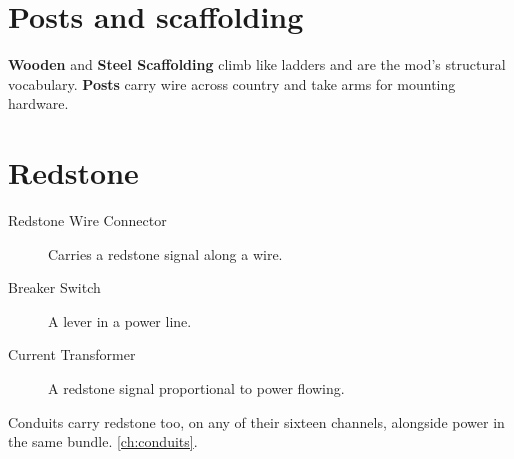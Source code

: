 \section{Posts and scaffolding}

\textbf{Wooden} and \textbf{Steel Scaffolding} climb like ladders and are the mod's structural
vocabulary. \textbf{Posts} carry wire across country and take arms for mounting hardware.

\section{Redstone}

\begin{description}
\item[Redstone Wire Connector] Carries a redstone signal along a wire.
\item[Breaker Switch] A lever in a power line.
\item[Current Transformer] A redstone signal proportional to power flowing.
\end{description}

\begin{iefork}
Conduits carry redstone too, on any of their sixteen channels, alongside power in the same bundle.
\autoref{ch:conduits}.
\end{iefork}
